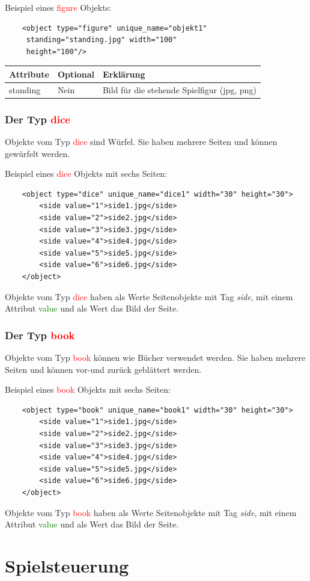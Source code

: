 \documentclass[ngerman]{scrbook}
\newcommand{\gamefigure}{\textcolor{red}{figure}\xspace}
\newcommand{\dice}{\textcolor{red}{dice}\xspace}
\newcommand{\book}{\textcolor{red}{book}\xspace}
\newcommand{\xmlattribute}[1]{\textcolor{green}{#1}}
\begin{document}
	Beispiel eines \gamefigure Objekts:
	
	\lstset{language=XML}
	\begin{lstlisting}	
	<object type="figure" unique_name="objekt1"
	 standing="standing.jpg" width="100" 
	 height="100"/>
	\end{lstlisting}
	

	\begin{table}[!h]
		\renewcommand{\arraystretch}{1.5}
		\begin{tabularx}{\textwidth}{XXX}
			Attribute & Optional & Erklärung\\\hline
			standing & Nein & Bild für die stehende Spielfigur (jpg, png)
		\end{tabularx}
	\end{table}


	\subsection{Der Typ \dice}
	Objekte vom Typ \dice sind Würfel. Sie haben mehrere Seiten und können gewürfelt werden.

	Beispiel eines \dice Objekts mit sechs Seiten:
	
	\lstset{language=XML}
	\begin{lstlisting}	
	<object type="dice" unique_name="dice1" width="30" height="30">
		<side value="1">side1.jpg</side>
		<side value="2">side2.jpg</side>
		<side value="3">side3.jpg</side>
		<side value="4">side4.jpg</side>
		<side value="5">side5.jpg</side>
		<side value="6">side6.jpg</side>
	</object>
	\end{lstlisting}
	
	Objekte vom Typ \dice haben als Werte Seitenobjekte mit Tag \textit{side}, mit einem Attribut \xmlattribute{value} und als Wert das Bild der Seite.

	\subsection{Der Typ \book}
	Objekte vom Typ \book können wie Bücher verwendet werden. Sie haben mehrere Seiten und können vor-und zurück geblättert werden.
	
	Beispiel eines \book Objekts mit sechs Seiten:
	
	\lstset{language=XML}
	\begin{lstlisting}	
	<object type="book" unique_name="book1" width="30" height="30">
		<side value="1">side1.jpg</side>
		<side value="2">side2.jpg</side>
		<side value="3">side3.jpg</side>
		<side value="4">side4.jpg</side>
		<side value="5">side5.jpg</side>
		<side value="6">side6.jpg</side>
	</object>
	\end{lstlisting}
	
	Objekte vom Typ \book haben als Werte Seitenobjekte mit Tag \textit{side}, mit einem Attribut \xmlattribute{value} und als Wert das Bild der Seite.


	\chapter{Spielsteuerung}
\end{document}

